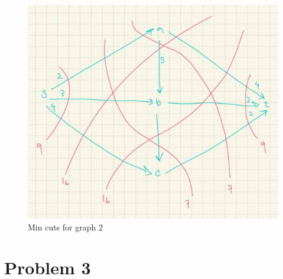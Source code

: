 \documentclass[12pt,letterpaper]{article}
\begin{document}
\newpage

\begin{figure}[!h]
  \centering
  \includegraphics[width=0.9\linewidth]{q2.2.jpg}
  \caption{Min cuts for graph 2}
  \end{figure}

\newpage

\section*{Problem 3}
\end{document}
